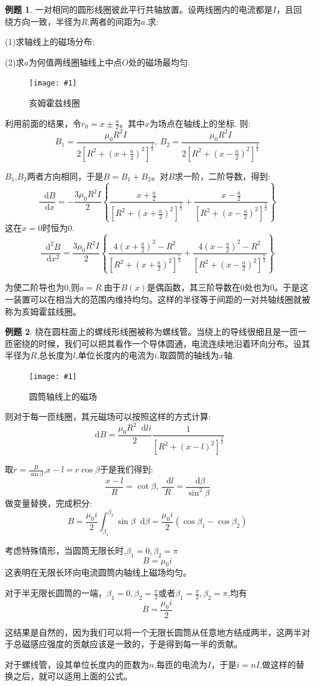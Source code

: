 \documentclass[12pt,a4paper,oneside]{report}
\theoremstyle{definition}
\newtheorem{example}{例题}[chapter]
\theoremstyle{remark}
\newcommand{\insertfig}[3]{
    \begin{figure}[ht]
        \centering
        \texttt{[image: \#1]}
        \caption{#2}
        \label{fig:#1}
    \end{figure}
}
\renewcommand{\d}{\mathop{}\!\mathrm{d}}
\begin{document}
\begin{example}
一对相同的圆形线圈彼此平行共轴放置。设两线圈内的电流都是$I$，且回绕方向一致，半径为$R$,两者的间距为$a$.求:

(1)求轴线上的磁场分布;

(2)求$a$为何值两线圈轴线上中点$O$处的磁场最均匀.
\insertfig{2-4.png}{亥姆霍兹线圈}{0.25}

利用前面的结果，令$r_0=x\pm\frac{a}{2}$。其中$x$为场点在轴线上的坐标.
则:
\[
B_1=\frac{\mu_0R^2I}{2[R^2+(x+\frac{a}{2})^2]^{\frac{3}{2}}}, \, B_2=\frac{\mu_0R^2I}{2[R^2+(x-\frac{a}{2})^2]^{\frac{3}{2}}}
\]

$B_1$,$B_2$两者方向相同，于是$B=B_1+B_2$。对$B$求一阶，二阶导数，得到:
\[
\frac{\d B}{\d x}=-\frac{3\mu_0R^2I}{2}\left\{ \frac{x+\frac{a}{2}}{[R^2+(x+\frac{a}{2})^2]^{\frac{5}{2}}}+\frac{x-\frac{a}{2}}{[R^2+(x-\frac{a}{2})^2]^{\frac{5}{2}}}\right\}
\]
这在$x=0$时恒为$0$.
\[
\frac{\d^2 B}{\d x^2} = \frac{3\mu_0R^2I}{2}\left\{ \frac{4(x+\frac{a}{2})^2-R^2}{[R^2+(x+\frac{a}{2})^2]^{\frac{7}{2}}}+\frac{4(x-\frac{a}{2})^2-R^2}{[R^2+(x-\frac{a}{2})^2]^{\frac{7}{2}}}\right\}
\]

为使二阶导也为$0$,则$a=R$.由于$B(x)$是偶函数，其三阶导数在$0$处也为$0$。于是这一装置可以在相当大的范围内维持均匀。这样的半径等于间距的一对共轴线圈就被称为亥姆霍兹线圈。
\end{example}

\begin{example}
  绕在圆柱面上的螺线形线圈被称为螺线管。当绕上的导线很细且是一匝一匝密绕的时候，我们可以把其看作一个导体圆通，电流连续地沿着环向分布。设其半径为$R$,总长度为$l$,单位长度内的电流为$i$.取圆筒的轴线为$x$轴.

  \insertfig{2-5.png}{圆筒轴线上的磁场}{0.3}

  则对于每一匝线圈，其元磁场可以按照这样的方式计算:
  \[
  \d B = \frac{\mu_0R^2\d li}{2}\frac{1}{[R^2+(x-l)^2]^\frac{3}{2}}
  \]

  取$r=\frac{R}{\sin\beta}$,$x-l=r\cos\beta$于是我们得到:
  \[
  \frac{x-l}{R}=\cot\beta, \,\frac{\d l}{R}=\frac{\d \beta}{\sin^2\beta}
  \]
  做变量替换，完成积分:
  \[
  B=\frac{\mu_0 i}{2}\int_{\beta_1}^{\beta_2}\sin\beta\d\beta=\frac{\mu_0i}{2}(\cos\beta_1-\cos\beta_2)
  \]

  考虑特殊情形，当圆筒无限长时,$\beta_1=0,\beta_2=\pi$
  \[
  B=\mu_0 i
  \]
  这表明在无限长环向电流圆筒内轴线上磁场均匀。
  
  对于半无限长圆筒的一端，$\beta_1=0,\beta_2=\frac{\pi}{2}$或者$\beta_1=\frac{\pi}{2},\beta_2=\pi$,均有
  \[
  B = \frac{\mu_0i}{2}
  \]

  这结果是自然的，因为我们可以将一个无限长圆筒从任意地方结成两半，这两半对于总磁感应强度的贡献应该是一致的，于是得到每一半的贡献。

  对于螺线管，设其单位长度内的匝数为$n$,每匝的电流为$I$，于是$i=nI$,做这样的替换之后，就可以适用上面的公式。
\end{example}
\end{document}
